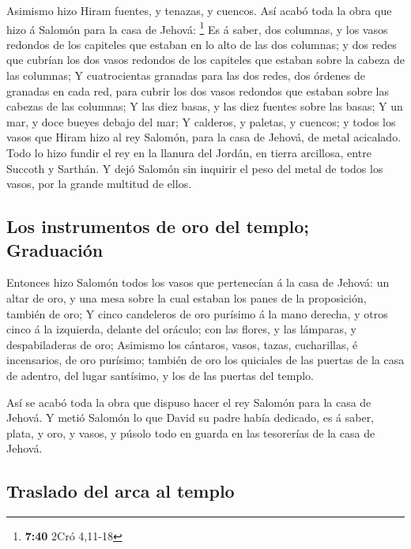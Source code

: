  Asimismo hizo Hiram fuentes, y tenazas, y cuencos. Así
acabó toda la obra que hizo á Salomón para la casa de Jehová:
\footnote{\textbf{7:40} 2Cró 4,11-18}  Es á saber, dos
columnas, y los vasos redondos de los capiteles que estaban en lo alto
de las dos columnas; y dos redes que cubrían los dos vasos redondos de
los capiteles que estaban sobre la cabeza de las columnas; 
Y cuatrocientas granadas para las dos redes, dos órdenes de granadas en
cada red, para cubrir los dos vasos redondos que estaban sobre las
cabezas de las columnas;  Y las diez basas, y las diez
fuentes sobre las basas;  Y un mar, y doce bueyes debajo
del mar;  Y calderos, y paletas, y cuencos; y todos los
vasos que Hiram hizo al rey Salomón, para la casa de Jehová, de metal
acicalado.  Todo lo hizo fundir el rey en la llanura del
Jordán, en tierra arcillosa, entre Succoth y Sarthán.  Y
dejó Salomón sin inquirir el peso del metal de todos los vasos, por la
grande multitud de ellos.

\hypertarget{los-instrumentos-de-oro-del-templo-graduaciuxf3n}{%
\subsection{Los instrumentos de oro del templo;
Graduación}\label{los-instrumentos-de-oro-del-templo-graduaciuxf3n}}

 Entonces hizo Salomón todos los vasos que pertenecían á la
casa de Jehová: un altar de oro, y una mesa sobre la cual estaban los
panes de la proposición, también de oro;  Y cinco
candeleros de oro purísimo á la mano derecha, y otros cinco á la
izquierda, delante del oráculo; con las flores, y las lámparas, y
despabiladeras de oro;  Asimismo los cántaros, vasos,
tazas, cucharillas, é incensarios, de oro purísimo; también de oro los
quiciales de las puertas de la casa de adentro, del lugar santísimo, y
los de las puertas del templo.

 Así se acabó toda la obra que dispuso hacer el rey Salomón
para la casa de Jehová. Y metió Salomón lo que David su padre había
dedicado, es á saber, plata, y oro, y vasos, y púsolo todo en guarda en
las tesorerías de la casa de Jehová.

\hypertarget{traslado-del-arca-al-templo}{%
\subsection{Traslado del arca al
templo}\label{traslado-del-arca-al-templo}}

